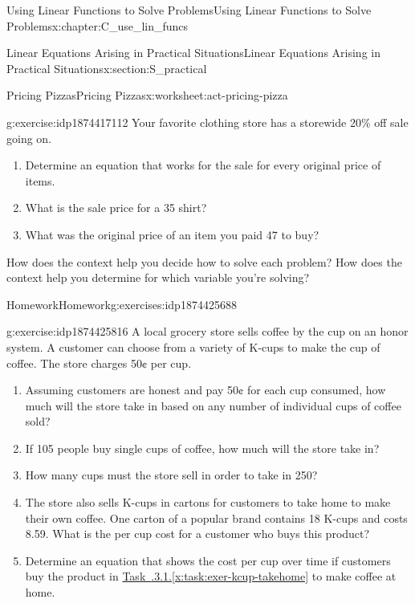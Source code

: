 \documentclass[oneside,10pt,]{book}
\newcommand{\xreffont}{\relax}
\numberwithin{equation}{chapter}
\begin{document}
\begin{chapterptx}{Using Linear Functions to Solve Problems}{}{Using Linear Functions to Solve Problems}{}{}{x:chapter:C_use_lin_funcs}
\begin{sectionptx}{Linear Equations Arising in Practical Situations}{}{Linear Equations Arising in Practical Situations}{}{}{x:section:S_practical}
\begin{worksheet-subsection}{Pricing Pizzas}{}{Pricing Pizzas}{}{}{x:worksheet:act-pricing-pizza}
\begin{divisionexercise}{10}{}{}{g:exercise:idp1874417112}%
Your favorite clothing store has a storewide 20\% off sale going on.%
\begin{enumerate}[font=\bfseries,label=(\alph*),ref=\alph*]
\item{}Determine an equation that works for the sale for every original price of items.%
\item{}What is the sale price for a \textdollar{}35 shirt?%
\item{}What was the original price of an item you paid \textdollar{}47 to buy?%
\end{enumerate}
\end{divisionexercise}%
\begin{conclusion}{}%
How does the context help you decide how to solve each problem? How does the context help you determine for which variable you're solving?%
\end{conclusion}%
\end{worksheet-subsection}
\restoregeometry
%
%
\typeout{************************************************}
\typeout{************************************************}
%
\begin{exercises-subsection}{Homework}{}{Homework}{}{}{g:exercises:idp1874425688}
\begin{divisionexercise}{1}{}{}{g:exercise:idp1874425816}%
A local grocery store sells coffee by the cup on an honor system. A customer can choose from a variety of K-cups to make the cup of coffee. The store charges 50¢ per cup.%
\begin{enumerate}[font=\bfseries,label=(\alph*),ref=\alph*]
\item{}Assuming customers are honest and pay 50¢ for each cup consumed, how much will the store take in based on any number of individual cups of coffee sold?%
\item{}If 105 people buy single cups of coffee, how much will the store take in?%
\item{}How many cups must the store sell in order to take in \textdollar{}250?%
\item\label{x:task:exer-kcup-takehome}The store also sells K-cups in cartons for customers to take home to make their own coffee. One carton of a popular brand contains 18 K-cups and costs \textdollar{}8.59. What is the per cup cost for a customer who buys this product?%
\item\label{x:task:exer-kcup-takehome-eq}Determine an equation that shows the cost per cup over time if customers buy the product in \hyperref[x:task:exer-kcup-takehome]{Task~{\xreffont 3.1.3.1}.{\xreffont\ref{x:task:exer-kcup-takehome}}} to make coffee at home.%

\end{enumerate}
\end{divisionexercise}
\end{exercises-subsection}
\end{sectionptx}
\end{chapterptx}
\end{document}
